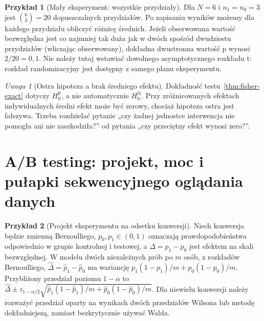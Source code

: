\documentclass[11pt,a4paper,oneside]{report}
\numberwithin{equation}{chapter}
\theoremstyle{plain}
\theoremstyle{definition}
\newtheorem{przyklad}{Przykład}[chapter]
\theoremstyle{remark}
\newtheorem{uwaga}{Uwaga}[chapter]
\begin{document}
\begin{przyklad}[Mały eksperyment: wszystkie przydziały]
Dla $N=6$ i $n_1=n_0=3$ jest $\binom63=20$ dopuszczalnych przydziałów. Po zapisaniu wyników możemy dla każdego przydziału obliczyć różnicę średnich. Jeżeli obserwowana wartość bezwzględna jest co najmniej tak duża jak w dwóch spośród dwudziestu przydziałów (wliczając obserwowany), dokładna dwustronna wartość p wynosi $2/20=0{,}1$. Nie należy tutaj wstawiać dowolnego asymptotycznego rozkładu t: rozkład randomizacyjny jest dostępny z samego planu eksperymentu.
\end{przyklad}

\begin{uwaga}[Ostra hipoteza a brak średniego efektu]
Dokładność testu~\ref{thm:fisher-exact} dotyczy $H_0^{\mathrm F}$, a nie automatycznie $H_0^{\mathrm N}$. Przy zróżnicowanych efektach indywidualnych średni efekt może być zerowy, chociaż hipoteza ostra jest fałszywa. Trzeba rozdzielać pytanie „czy żadnej jednostce interwencja nie pomogła ani nie zaszkodziła?” od pytania „czy przeciętny efekt wynosi zero?”.
\end{uwaga}

\section{A/B testing: projekt, moc i pułapki sekwencyjnego oglądania danych}
\begin{przyklad}[Projekt eksperymentu na odsetku konwersji]
Niech konwersja będzie zmienną Bernoulliego, $p_0,p_1\in(0,1)$ oznaczają prawdopodobieństwa odpowiednio w grupie kontrolnej i testowej, a $\Delta=p_1-p_0$ jest efektem na skali bezwzględnej. W modelu dwóch niezależnych prób po $m$ osób, z rozkładów Bernoulliego, $\widehat\Delta=\widehat p_1-\widehat p_0$ ma wariancję $p_1(1-p_1)/m+p_0(1-p_0)/m$. Przybliżony przedział poziomu $1-\alpha$ to $\widehat\Delta\pm z_{1-\alpha/2}\sqrt{\widehat p_1(1-\widehat p_1)/m+\widehat p_0(1-\widehat p_0)/m}$. Dla niewielu konwersji należy rozważyć przedział oparty na wynikach dwóch przedziałów Wilsona lub metodę dokładniejszą, zamiast bezkrytycznie używać Walda.
\end{przyklad}
\end{document}
